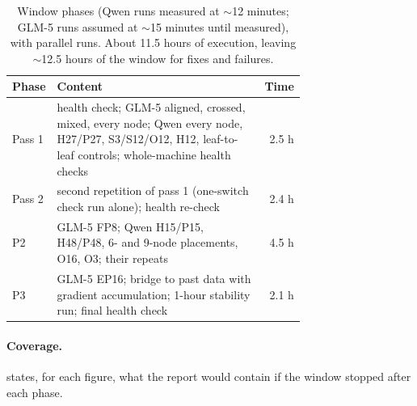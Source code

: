 \begin{table}[h]
  \caption{Window phases (Qwen runs measured at $\sim$12 minutes; GLM-5 runs assumed at $\sim$15 minutes until
    measured), with parallel runs. About 11.5 hours of execution, leaving $\sim$12.5 hours of the window for
    fixes and failures.}
  \label{tab:phases}
  \centering\small
  \begin{tabular}{lp{0.72\linewidth}r}
    \toprule
    Phase & Content & Time \\
    \midrule
    Pass 1 & health check; GLM-5 aligned, crossed, mixed, every node; Qwen every node, H27/P27, S3/S12/O12, H12,
             leaf-to-leaf controls; whole-machine health checks & 2.5 h \\
    Pass 2 & second repetition of pass 1 (one-switch check run alone); health re-check & 2.4 h \\
    P2 & GLM-5 FP8; Qwen H15/P15, H48/P48, 6- and 9-node placements, O16, O3; their repeats & 4.5 h \\
    P3 & GLM-5 EP16; bridge to past data with gradient accumulation; 1-hour stability run; final health check & 2.1 h \\
    \bottomrule
  \end{tabular}
\end{table}

\paragraph{Coverage.}  states, for each figure, what the report would contain if the
window stopped after each phase.

